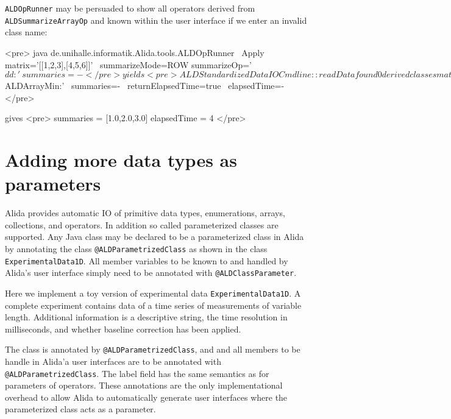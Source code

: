 \lstinline+ALDOpRunner+ may be persuaded to show all operators derived from \lstinline+ALDSummarizeArrayOp+
and known within the user interface if we enter an invalid class name:

<pre>
java de.unihalle.informatik.Alida.tools.ALDOpRunner \
	Apply matrix='[[1,2,3],[4,5,6]]' \
	summarizeMode=ROW summarizeOp='$dd:{}' \
	summaries=-
</pre>

yields

<pre>
ALDStandardizedDataIOCmdline::readData found 0 derived classes matching <dd>
      derived classes available:
	de.unihalle.informatik.Alida.demo.ALDArrayMean
	de.unihalle.informatik.Alida.demo.ALDArrayMin
	de.unihalle.informatik.Alida.demo.ALDArraySum
ERROR: reading parameter <summarizeOp> returns null
</pre>


Supplemental parameters are handled like other parameters

<pre>
java de.unihalle.informatik.Alida.tools.ALDOpRunner Apply \
	matrix='[[1,2,3],[4,5,6]]' \
	summarizeMode=COLUMN \
	summarizeOp='$ALDArrayMin:{}' \
	summaries=- \
	returnElapsedTime=true \
	elapsedTime=-
</pre>

gives
<pre>
	summaries = [1.0,2.0,3.0]
	elapsedTime = 4
</pre>



\section{  Adding more data types as parameters}

Alida provides automatic IO of primitive data types, enumerations, arrays, collections,
and operators.
In addition so called parameterized classes are supported.
Any Java class may be declared to be a parameterized class in Alida
by annotating the class \lstinline+@ALDParametrizedClass+ as shown in the
class \lstinline+ExperimentalData1D+.
All member variables to be known to and handled by Alida's user interface
simply need to be annotated with \lstinline+@ALDClassParameter+.

Here we implement a toy version of experimental data \lstinline+ExperimentalData1D+.
A complete experiment contains
data of a time series of measurements of variable length.
Additional information is a descriptive string, the time resolution in milliseconds,
and whether baseline correction has been applied.

The class is annotated by \lstinline+@ALDParametrizedClass+, and
and all members to be handle in Alida'a user interfaces are
to be annotated with \lstinline+@ALDParametrizedClass+.
The label field has the same semantics as for parameters of operators.
These annotations are the only implementational overhead
to allow Alida to automatically generate user interfaces
where the parameterized class acts as a parameter.

